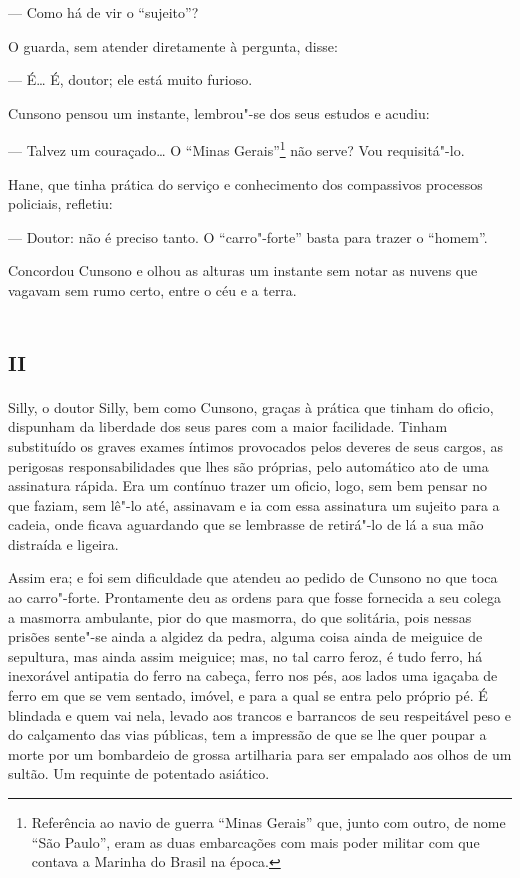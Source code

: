 --- Como há de vir o ``sujeito''?

O guarda, sem atender diretamente à pergunta, disse:

--- É\ldots{} É, doutor; ele está muito furioso.

Cunsono pensou um instante, lembrou"-se dos seus estudos e acudiu:

--- Talvez um couraçado\ldots{} O ``Minas Gerais''\footnote{Referência ao navio
  de guerra ``Minas Gerais'' que, junto com outro, de nome ``São
  Paulo'', eram as duas embarcações com mais poder militar com que
  contava a Marinha do Brasil na época.} não serve? Vou requisitá"-lo.

Hane, que tinha prática do serviço e conhecimento dos compassivos
processos policiais, refletiu:

--- Doutor: não é preciso tanto. O ``carro"-forte'' basta para trazer o
``homem''.

Concordou Cunsono e olhou as alturas um instante sem notar as nuvens que
vagavam sem rumo certo, entre o céu e a terra.

\section{\textsc{ii}}

Silly, o doutor Silly, bem como Cunsono, graças à prática que tinham do
oficio, dispunham da liberdade dos seus pares com a maior facilidade.
Tinham substituído os graves exames íntimos provocados pelos deveres de
seus cargos, as perigosas responsabilidades que lhes são próprias, pelo
automático ato de uma assinatura rápida. Era um contínuo trazer um
oficio, logo, sem bem pensar no que faziam, sem lê"-lo até, assinavam e
ia com essa assinatura um sujeito para a cadeia, onde ficava aguardando
que se lembrasse de retirá"-lo de lá a sua mão distraída e ligeira.

Assim era; e foi sem dificuldade que atendeu ao pedido de Cunsono no que
toca ao carro"-forte. Prontamente deu as ordens para que fosse fornecida
a seu colega a masmorra ambulante, pior do que masmorra, do que
solitária, pois nessas prisões sente"-se ainda a algidez da pedra, alguma
coisa ainda de meiguice de sepultura, mas ainda assim meiguice; mas, no
tal carro feroz, é tudo ferro, há inexorável antipatia do ferro na
cabeça, ferro nos pés, aos lados uma igaçaba de ferro em que se vem
sentado, imóvel, e para a qual se entra pelo próprio pé. É blindada e
quem vai nela, levado aos trancos e barrancos de seu respeitável peso e
do calçamento das vias públicas, tem a impressão de que se lhe quer
poupar a morte por um bombardeio de grossa artilharia para ser empalado
aos olhos de um sultão. Um requinte de potentado asiático.

